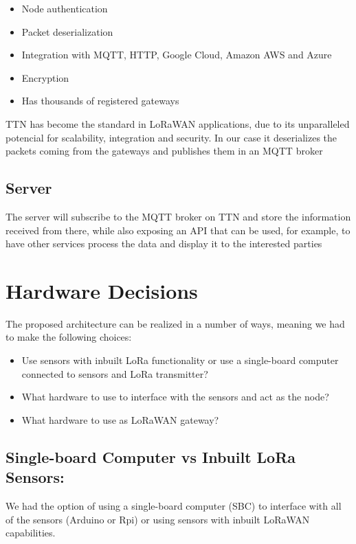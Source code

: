 		\begin{itemize}
			\item Node authentication
			\item Packet deserialization
			\item Integration with MQTT, HTTP, Google Cloud, Amazon AWS and Azure
			\item Encryption
			\item Has thousands of registered gateways
		\end{itemize}

		TTN has become the standard in LoRaWAN applications, due to its unparalleled potencial for scalability, integration and security. In our case it deserializes the packets coming from the gateways and publishes them in an MQTT broker 

	\subsection{Server}
		The server will subscribe to the MQTT broker on TTN and store the information received from there, while also exposing an API that can be used, for example, to have other services process the data and display it to the interested parties

\section{Hardware Decisions}

	The proposed architecture can be realized in a number of ways, meaning we had to make the following choices:
	\begin{itemize}
		\item Use sensors with inbuilt LoRa functionality or use a single-board computer connected to sensors and LoRa transmitter?
		\item What hardware to use to interface with the sensors and act as the node?
		\item What hardware to use as LoRaWAN gateway?
	\end{itemize}


	\subsection{Single-board Computer vs Inbuilt LoRa Sensors:}

		We had the option of using a single-board computer (SBC) to interface with all of the sensors (Arduino or Rpi) or using sensors with inbuilt LoRaWAN capabilities.


